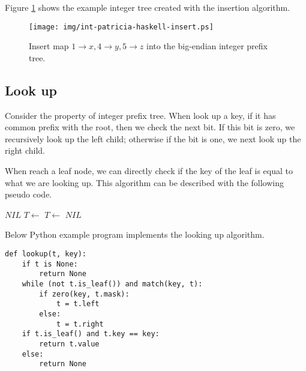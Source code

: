 \documentclass{article}
\begin{document}
Figure \ref{fig:int-patricia-haskell-insert} shows the example integer tree created
with the insertion algorithm.

\begin{figure}[htbp]
  \centering
  \texttt{[image: img/int-patricia-haskell-insert.ps]}
  \caption{Insert map $1 \rightarrow x, 4 \rightarrow y, 5 \rightarrow z$ into the big-endian integer prefix tree.}
  \label{fig:int-patricia-haskell-insert}
\end{figure}


\subsection{Look up}
Consider the property of integer prefix tree. When look up a
key, if it has common prefix with the root,
then we check the next bit. If
this bit is zero, we recursively look up the left child;
otherwise if the bit is one, we next look up the right child.

When reach a leaf node, we can directly check if the key of the
leaf is equal to what we are looking up. This algorithm can be
described with the following pseudo code.

\begin{algorithmic}[1]
    \State \Return $NIL$ 
  \EndIf
      \State $T \gets$ 
    \Else
      \State $T \gets$ 
    \EndIf
  \EndWhile
    \State \Return {}
  \Else
    \State \Return $NIL$ 
  \EndIf
\EndFunction
\end{algorithmic}

Below Python example program implements the looking up algorithm.

\lstset{language=Python}
\begin{lstlisting}
def lookup(t, key):
    if t is None:
        return None
    while (not t.is_leaf()) and match(key, t):
        if zero(key, t.mask):
            t = t.left
        else:
            t = t.right
    if t.is_leaf() and t.key == key:
        return t.value
    else:
        return None
\end{lstlisting}
\end{document}
